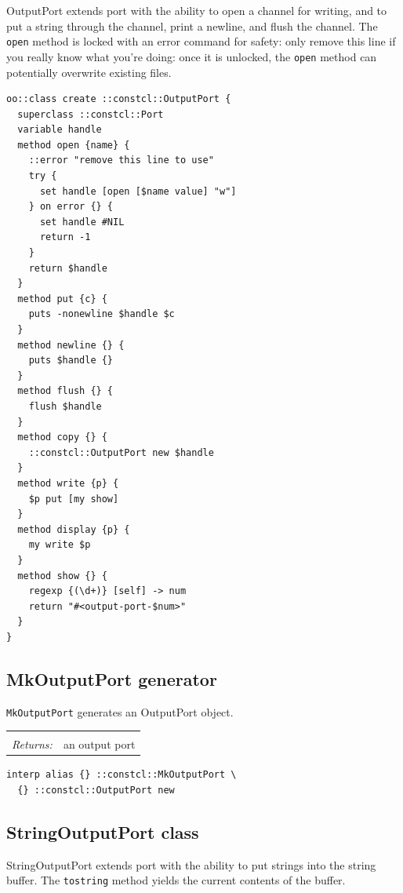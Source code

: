 \documentclass[twoside]{report}
\begin{document}
OutputPort extends port with the ability to open a channel for writing, and to put a string through the channel, print a newline, and flush the channel. The \texttt{open} method is locked with an error command for safety: only remove this line if you really know what you're doing: once it is unlocked, the \texttt{open} method can potentially overwrite existing files.

\begin{lstlisting}
oo::class create ::constcl::OutputPort {
  superclass ::constcl::Port
  variable handle
  method open {name} {
    ::error "remove this line to use"
    try {
      set handle [open [$name value] "w"]
    } on error {} {
      set handle #NIL
      return -1
    }
    return $handle
  }
  method put {c} {
    puts -nonewline $handle $c
  }
  method newline {} {
    puts $handle {}
  }
  method flush {} {
    flush $handle
  }
  method copy {} {
    ::constcl::OutputPort new $handle
  }
  method write {p} {
    $p put [my show]
  }
  method display {p} {
    my write $p
  }
  method show {} {
    regexp {(\d+)} [self] -> num
    return "#<output-port-$num>"
  }
}
\end{lstlisting}

\subsection{MkOutputPort generator}
\label{mkoutputport-generator}

\texttt{MkOutputPort} generates an OutputPort object.

\noindent\begin{tabular}{ |p{1.9cm} p{8cm}| }
\hline
\rowcolor[HTML]{CCCCCC} \multicolumn{2}{|l|}{\bf MkOutputPort (internal)} \\
\textit{Returns:} & an output port \\
\hline
\end{tabular}

\begin{lstlisting}
interp alias {} ::constcl::MkOutputPort \
  {} ::constcl::OutputPort new
\end{lstlisting}

\subsection{StringOutputPort class}
\label{stringoutputport-class}

StringOutputPort extends port with the ability to put strings into the string buffer. The \texttt{tostring} method yields the current contents of the buffer.
\end{document}

